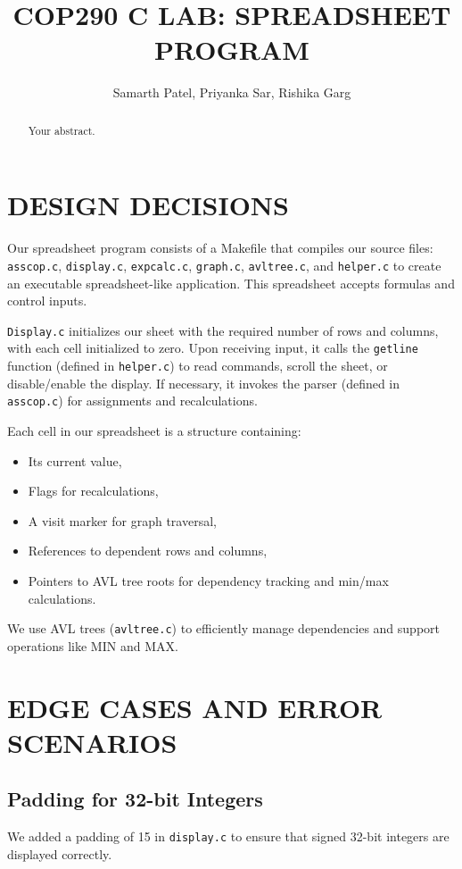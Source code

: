 \documentclass[a4paper]{article}
\title{COP290 C LAB: SPREADSHEET PROGRAM}
\author{Samarth Patel, Priyanka Sar, Rishika Garg}
\begin{document}
\maketitle

\begin{abstract}
Your abstract.
\end{abstract}

\section{DESIGN DECISIONS}

Our spreadsheet program consists of a Makefile that compiles our source files: \texttt{asscop.c}, \texttt{display.c}, \texttt{expcalc.c}, \texttt{graph.c}, \texttt{avltree.c}, and \texttt{helper.c} to create an executable spreadsheet-like application. This spreadsheet accepts formulas and control inputs.

\texttt{Display.c} initializes our sheet with the required number of rows and columns, with each cell initialized to zero. Upon receiving input, it calls the \texttt{getline} function (defined in \texttt{helper.c}) to read commands, scroll the sheet, or disable/enable the display. If necessary, it invokes the parser (defined in \texttt{asscop.c}) for assignments and recalculations. 

Each cell in our spreadsheet is a structure containing:
\begin{itemize}
    \item Its current value,
    \item Flags for recalculations,
    \item A visit marker for graph traversal,
    \item References to dependent rows and columns,
    \item Pointers to AVL tree roots for dependency tracking and min/max calculations.
\end{itemize}

We use AVL trees (\texttt{avltree.c}) to efficiently manage dependencies and support operations like MIN and MAX.

\section{EDGE CASES AND ERROR SCENARIOS}

\subsection{Padding for 32-bit Integers}
We added a padding of 15 in \texttt{display.c} to ensure that signed 32-bit integers are displayed correctly.
\end{document}
